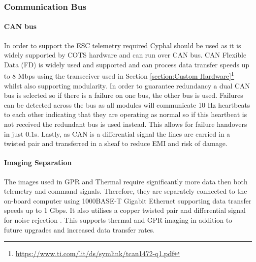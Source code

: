 \subsubsection{Communication Bus}\label{sub_sub_section:tgt_bus}
\paragraph{\gls{CAN} bus}
In order to support the \gls{ESC} telemetry required Cyphal should be used as it is widely supported by \gls{COTS} hardware and can run over \gls{CAN} bus. CAN Flexible Data (FD) is widely used and supported and can process data transfer speeds up to 8 Mbps using the transceiver used in Section \ref{section:Custom Hardware}\footnote{\url{https://www.ti.com/lit/ds/symlink/tcan1472-q1.pdf}} whilst also supporting modularity. In order to guarantee redundancy a dual \gls{CAN} bus is selected so if there is a failure on one bus, the other bus is used. Failures can be detected across the bus as all modules will communicate 10 Hz heartbeats to each other indicating that they are operating as normal so if this heartbeat is not received the redundant bus is used instead. This allows for failure handovers in just 0.1s. Lastly, as \gls{CAN} is a differential signal the lines are carried in a twisted pair and transferred in a sheaf to reduce \gls{EMI} and risk of damage. 
\paragraph{Imaging Separation}
The images used in GPR and Thermal require significantly more data then both telemetry and command signals. Therefore, they are separately connected to the on-board computer using 1000BASE-T Gigabit Ethernet supporting data transfer speeds up to 1 Gbps. It also utilises a copper twisted pair and differential signal for noise rejection \cite{Ethernet}.  This supports thermal and GPR imaging in addition to future upgrades and increased data transfer rates.
